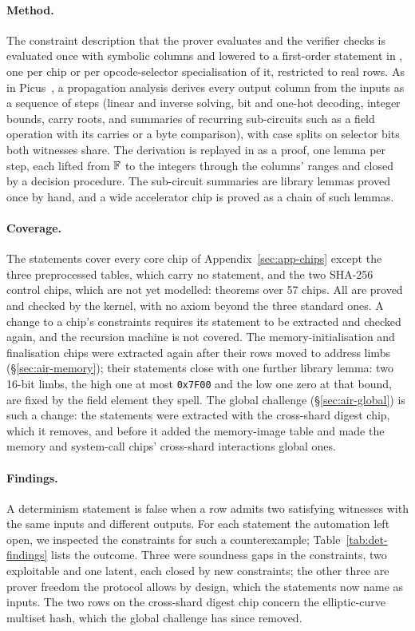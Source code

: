 \paragraph{Method.} The constraint description that the prover evaluates and the verifier checks is evaluated once with symbolic columns and lowered to a first-order statement in \Lean{}, one per chip or per opcode-selector specialisation of it, restricted to real rows. As in Picus~\citep{picus}, a propagation analysis derives every output column from the inputs as a sequence of steps (linear and inverse solving, bit and one-hot decoding, integer bounds, carry roots, and summaries of recurring sub-circuits such as a field operation with its carries or a byte comparison), with case splits on selector bits both witnesses share. The derivation is replayed in \Lean{} as a proof, one lemma per step, each lifted from $\mathbb{F}$ to the integers through the columns' ranges and closed by a decision procedure. The sub-circuit summaries are library lemmas proved once by hand, and a wide accelerator chip is proved as a chain of such lemmas.

\paragraph{Coverage.} The statements cover every core chip of Appendix~\ref{sec:app-chips} except the three preprocessed tables, which carry no statement, and the two SHA-256 control chips, which are not yet modelled: \ndettotal{} theorems over 57 chips. All are proved and checked by the \Lean{} kernel, with no axiom beyond the three standard ones. A change to a chip's constraints requires its statement to be extracted and checked again, and the recursion machine is not covered. The memory-initialisation and finalisation chips were extracted again after their rows moved to address limbs (\S\ref{sec:air-memory}); their statements close with one further library lemma: two 16-bit limbs, the high one at most \texttt{0x7F00} and the low one zero at that bound, are fixed by the field element they spell. The global challenge (\S\ref{sec:air-global}) is such a change: the statements were extracted with the cross-shard digest chip, which it removes, and before it added the memory-image table and made the memory and system-call chips' cross-shard interactions global ones.

\paragraph{Findings.} A determinism statement is false when a row admits two satisfying witnesses with the same inputs and different outputs. For each statement the automation left open, we inspected the constraints for such a counterexample; Table~\ref{tab:det-findings} lists the outcome. Three were soundness gaps in the constraints, two exploitable and one latent, each closed by new constraints; the other three are prover freedom the protocol allows by design, which the statements now name as inputs. The two rows on the cross-shard digest chip concern the elliptic-curve multiset hash, which the global challenge has since removed.

